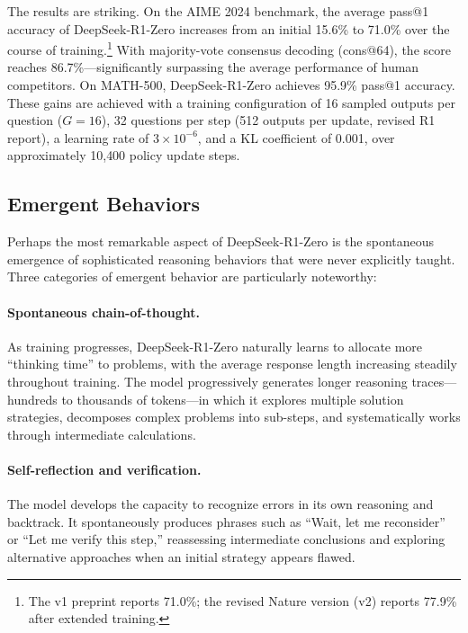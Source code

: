 The results are striking. On the AIME 2024 benchmark, the average pass@1 accuracy of
DeepSeek-R1-Zero increases from an initial 15.6\% to 71.0\% over the course of
training.\footnote{The v1 preprint reports 71.0\%; the revised Nature version (v2)
reports 77.9\% after extended training.} With majority-vote consensus decoding
(cons@64), the score reaches 86.7\%---significantly surpassing the average performance
of human competitors. On MATH-500, DeepSeek-R1-Zero achieves 95.9\% pass@1 accuracy. These gains are achieved with a training configuration of 16
sampled outputs per question ($G=16$), 32 questions per step (512 outputs per update, revised R1 report), a learning rate of $3 \times
10^{-6}$, and a KL coefficient of 0.001, over approximately 10{,}400 policy update
steps.

\subsection{Emergent Behaviors}

Perhaps the most remarkable aspect of DeepSeek-R1-Zero is the spontaneous emergence
of sophisticated reasoning behaviors that were never explicitly taught. Three
categories of emergent behavior are particularly noteworthy:

\paragraph{Spontaneous chain-of-thought.} As training progresses, DeepSeek-R1-Zero
naturally learns to allocate more ``thinking time'' to problems, with the average
response length increasing steadily throughout training. The model progressively
generates longer reasoning traces---hundreds to thousands of tokens---in which it
explores multiple solution strategies, decomposes complex problems into sub-steps, and
systematically works through intermediate calculations.

\paragraph{Self-reflection and verification.} The model develops the capacity to
recognize errors in its own reasoning and backtrack. It spontaneously produces phrases
such as ``Wait, let me reconsider'' or ``Let me verify this step,'' reassessing
intermediate conclusions and exploring alternative approaches when an initial strategy
appears flawed.

